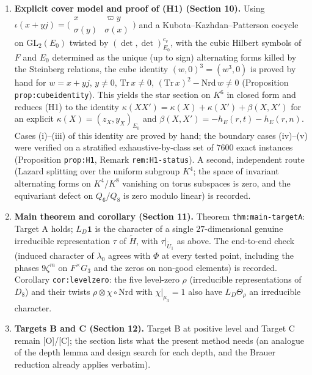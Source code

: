\documentclass[11pt]{article}
\begin{document}
\begin{enumerate}[leftmargin=*]
\item \textbf{Explicit cover model and proof of (H1) (Section 10).}
Using $\iota(x+yj)=\bigl(\begin{smallmatrix}x&\varpi y\\ \sigma(y)&\sigma(x)\end{smallmatrix}\bigr)$
and a Kubota--Kazhdan--Patterson cocycle on $\mathrm{GL}_2(E_0)$ twisted by
$(\det,\det)^{c_v}_{E_0}$, with the cubic Hilbert symbols of $F$ and $E_0$
determined as the unique (up to sign) alternating forms killed by the
Steinberg relations, the cube identity $(w,0)^3=(w^3,0)$ is proved by hand
for $w=x+yj$, $y\ne0$, $\mathrm{Tr}\,x\ne0$, $(\mathrm{Tr}\,x)^2-\mathrm{Nrd}\,w\ne0$
(Proposition \texttt{prop:cubeidentity}).  This yields the star section on
$K^6$ in closed form and reduces (H1) to the identity
$\kappa(XX')=\kappa(X)+\kappa(X')+\beta(X,X')$ for an explicit
$\kappa(X)=(z_X,y_X)_{E_0}$ and $\beta(X,X')=-h_E(r,t)-h_E(r,n)$.  Cases
(i)--(iii) of this identity are proved by hand; the boundary cases
(iv)--(v) were verified on a stratified exhaustive-by-class set of $7600$
exact instances (Proposition \texttt{prop:H1}, Remark \texttt{rem:H1-status}).
A second, independent route (Lazard splitting over the uniform subgroup
$K^4$; the space of invariant alternating forms on $K^4/K^8$ vanishing on
torus subspaces is zero, and the equivariant defect on $Q_6/Q_8$ is zero
modulo linear) is recorded.

\item \textbf{Main theorem and corollary (Section 11).}
Theorem \texttt{thm:main-targetA}: Target A holds; $L_D\mathbf 1$ is the
character of a single $27$-dimensional genuine irreducible representation
$\tau$ of $\tilde H$, with $\tau|_{\tilde U_1}$ as above.  The end-to-end
check (induced character of $\lambda_0$ agrees with $\Phi$ at every tested
point, including the phases $9\zeta^m$ on $F^\times G_3$ and the zeros on
non-good elements) is recorded.  Corollary \texttt{cor:levelzero}: the five
level-zero $\rho$ (irreducible representations of $D_8$) and their twists
$\rho\otimes\chi\circ\mathrm{Nrd}$ with $\chi|_{\mu_3}=1$ also have
$L_D\Theta_\rho$ an irreducible character.

\item \textbf{Targets B and C (Section 12).}  Target B at positive level and
Target C remain [O]/[C]; the section lists what the present method needs
(an analogue of the depth lemma and design search for each depth, and the
Brauer reduction already applies verbatim).
\end{enumerate}
\end{document}
